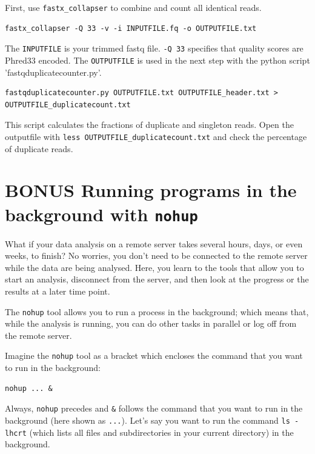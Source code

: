 \documentclass[11pt]{article}
\begin{document}
First, use \texttt{fastx\_collapser} to combine and count all identical reads.

\begin{verbatim}
fastx_collapser -Q 33 -v -i INPUTFILE.fq -o OUTPUTFILE.txt
\end{verbatim}

The \texttt{INPUTFILE} is your trimmed fastq file. \texttt{-Q 33} specifies that
quality scores are Phred33 encoded.  The \texttt{OUTPUTFILE} is used in the
next step with the python script 'fastqduplicatecounter.py'.

\begin{verbatim}
fastqduplicatecounter.py OUTPUTFILE.txt OUTPUTFILE_header.txt > OUTPUTFILE_duplicatecount.txt
\end{verbatim}

This script calculates the fractions of duplicate and singleton
reads. Open the outputfile with \texttt{less OUTPUTFILE\_duplicatecount.txt}
and check the percentage of duplicate reads.
\section{BONUS Running programs in the background with \texttt{nohup}}
\label{sec-5}
What if your data analysis on a remote server takes several hours,
days, or even weeks, to finish? No worries, you don't need to be
connected to the remote server while the data are being
analysed. Here, you learn to the tools that allow you to start
an analysis, disconnect from the server, and then look at the progress
or the results at a later time point.

The \texttt{nohup} tool allows you to run a process in the background; which
means that, while the analysis is running, you can do other tasks in
parallel or log off from the remote server.

Imagine the \texttt{nohup} tool as a bracket which encloses the command that
you want to run in the background:

\begin{verbatim}
nohup ... &
\end{verbatim}

Always, \texttt{nohup} precedes and \texttt{\&} follows the command that you want to
run in the background (here shown as \texttt{...}). Let's say you want to run
the command \texttt{ls -lhcrt} (which lists all files and subdirectories in
your current directory) in the background.
\end{document}
